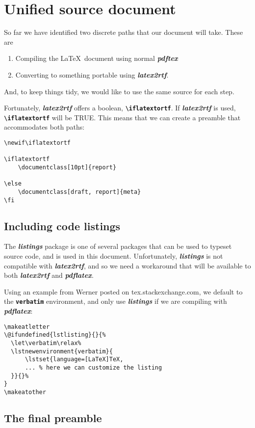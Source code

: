 \documentclass[12pt,letterpaper]{article}
\newcommand{\packagename}[1]{\textbf{\emph{#1}}}
\newcommand{\envname}[1]{\textbf{\texttt{#1}}}
\begin{document}
\section{Unified source document}
So far we have identified two discrete paths that our document will take. These are 
\begin{enumerate}
\item Compiling the \LaTeX\ document using normal \packagename{pdftex}
\item Converting to something portable using \packagename{latex2rtf}. 
\end{enumerate}
And, to keep things tidy, we would like to use the same source for each step. 

Fortunately, \packagename{latex2rtf} offers a boolean, \envname{\textbackslash iflatextortf}. If \packagename{latex2rtf} is used, \envname{\textbackslash iflatextortf} will be TRUE. This means that we can create a preamble that accommodates both paths:

\begin{verbatim}
\newif\iflatextortf

\iflatextortf
    \documentclass[10pt]{report}
    
\else
    \documentclass[draft, report]{meta} 
\fi
\end{verbatim}

\subsection{Including code listings}
The \packagename{listings} package is one of several packages that can be used to typeset source code, and is used in this document. Unfortunately, \packagename{listings} is not compatible with \packagename{latex2rtf}, and so we need a workaround that will be available to both \packagename{latex2rtf} and \packagename{pdflatex}. 

Using an example from Werner posted on tex.stackexchange.com, we default to the \envname{verbatim} environment, and only use \packagename{listings} if we are compiling with \packagename{pdflatex}:

\begin{verbatim}
\makeatletter
\@ifundefined{lstlisting}{}{%
  \let\verbatim\relax%
  \lstnewenvironment{verbatim}{
      \lstset{language=[LaTeX]TeX,
      ... % here we can customize the listing
  }}{}%
}
\makeatother
\end{verbatim}

\subsection{The final preamble}
\end{document}
